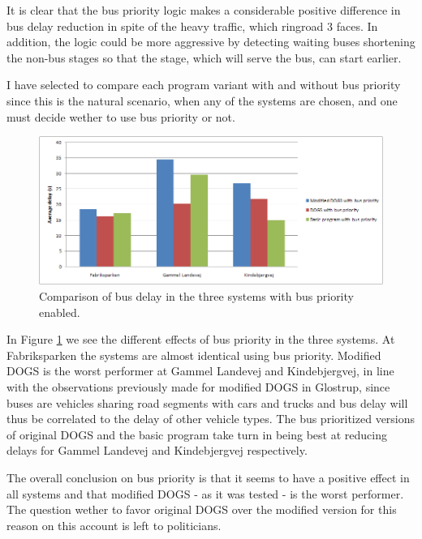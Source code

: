 It is clear that the bus priority logic makes a considerable positive difference in bus delay reduction in spite of the heavy traffic, which ringroad 3 faces. In addition, the logic could be more aggressive by detecting waiting buses shortening the non-bus stages so that the stage, which will serve the bus, can start earlier.

I have selected to compare each program variant with and without bus priority since this is the natural scenario, when any of the systems are chosen, and one must decide wether to use bus priority or not. 

\begin{figure}[htbp]
\centering
\includegraphics[width=\singleimwidth]{delay_bus_priority-all.png}
\caption{Comparison of bus delay in the three systems with bus priority enabled.}
\label{fig:buscomp}
\end{figure}

In Figure \ref{fig:buscomp} we see the different effects of bus priority in the three systems. At Fabriksparken the systems are almost identical using bus priority. Modified DOGS is the worst performer at Gammel Landevej and Kindebjergvej, in line with the observations previously made for modified DOGS in Glostrup, since buses are vehicles sharing road segments with cars and trucks and bus delay will thus be correlated to the delay of other vehicle types. The bus prioritized versions of original DOGS and the basic program take turn in being best at reducing delays for Gammel Landevej and Kindebjergvej respectively. 

The overall conclusion on bus priority is that it seems to have a positive effect in all systems and that modified DOGS - as it was tested - is the worst performer. The question wether to favor original DOGS over the modified version for this reason on this account is left to politicians.
